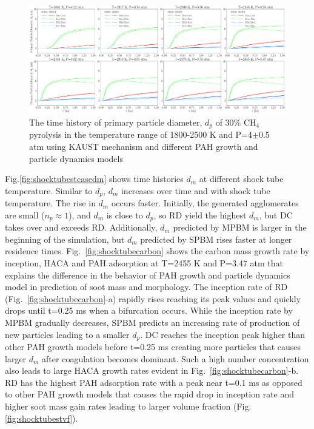 \begin{figure}[H]
	\centering
	\includegraphics[width=1\textwidth]{Figures/Results/Shocktube/Stanford/june/stsh_cases_dp.pdf}
	\caption{The time history of primary particle diameter, $d_p$ of 30\% $\mathrm{CH_4}$ pyrolysis in the temperature range of 1800-2500 K and P=4$\pm$0.5 atm using KAUST mechanism and different PAH growth and particle dynamics models}
	\label{fig:shocktubestcasedp} 
\end{figure}

Fig.\ref{fig:shocktubestcasedm} shows time histories $d_m$ at different shock tube temperature. Similar to $d_p$, $d_m$ increases over time and with shock tube temperature. The rise in $d_m$ occurs faster. Initially, the generated agglomerates are small ($n_p\approx1$), and $d_m$ is close to $d_p$, so RD yield the highest $d_m$, but DC takes over and exceeds RD. Additionally, $d_m$ predicted by MPBM is larger in the beginning of the simulation, but $d_m$ predicted by SPBM rises faster at longer residence times. Fig.~\ref{fig:shocktubecarbon} shows the carbon mass growth rate by inception, HACA and PAH adsorption at T=2455 K and P=3.47 atm that explains the difference in the behavior of PAH growth and particle dynamics model in prediction of soot mass and morphology. The inception rate of RD (Fig.~\ref{fig:shocktubecarbon}-a) rapidly rises reaching its peak values and quickly drops until t=0.25 ms when a bifurcation occurs. While the inception rate by MPBM gradually decreases, SPBM predicts an increasing rate of production of new particles leading to a smaller $d_p$. DC reaches the inception peak higher than other PAH growth models before t=0.25 ms creating more particles that causes larger $d_m$ after coagulation becomes dominant. Such a high number concentration also leads to large HACA growth rates evident in Fig.~\ref{fig:shocktubecarbon}-b. RD has the highest PAH adsorption rate with a peak near t=0.1 ms as opposed to other PAH growth models that causes the rapid drop in inception rate and higher soot mass gain rates leading to larger volume fraction (Fig.\ref{fig:shocktubestvf}).


